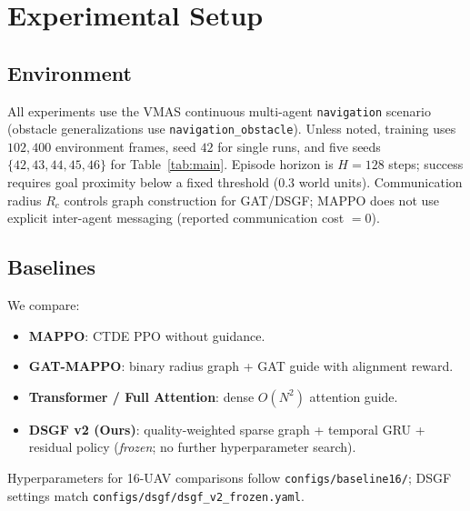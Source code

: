 
\section{Experimental Setup}
\label{sec:setup}

\subsection{Environment}
All experiments use the VMAS continuous multi-agent \texttt{navigation} scenario
(obstacle generalizations use \texttt{navigation\_obstacle}).
Unless noted, training uses $102{,}400$ environment frames, seed $42$ for single
runs, and five seeds $\{42,43,44,45,46\}$ for Table~\ref{tab:main}.
Episode horizon is $H{=}128$ steps; success requires goal proximity below a
fixed threshold ($0.3$ world units).
Communication radius $R_c$ controls graph construction for GAT/DSGF; MAPPO does
not use explicit inter-agent messaging (reported communication cost $=0$).

\subsection{Baselines}
We compare:
\begin{itemize}
  \item \textbf{MAPPO}: CTDE PPO without guidance.
  \item \textbf{GAT-MAPPO}: binary radius graph + GAT guide with alignment reward.
  \item \textbf{Transformer / Full Attention}: dense $O(N^{2})$ attention guide.
  \item \textbf{DSGF v2 (Ours)}: quality-weighted sparse graph + temporal GRU +
        residual policy (\emph{frozen}; no further hyperparameter search).
\end{itemize}
Hyperparameters for 16-UAV comparisons follow
\texttt{configs/baseline16/};
DSGF settings match \texttt{configs/dsgf/dsgf\_v2\_frozen.yaml}.

